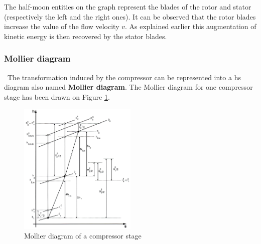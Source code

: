 The half-moon entities on the graph represent the blades of the rotor and stator (respectively the left and the right ones). It can be observed that the rotor blades increase the value of the flow velocity $v$. As explained earlier this augmentation of kinetic energy is then recovered by the stator blades. 

\subsubsection{Mollier diagram}
\quad\, The transformation induced by the compressor can be represented into a hs diagram also named \textbf{Mollier diagram}. The Mollier diagram for one compressor stage has been drawn on Figure \ref{fig:C3_Molliercomp}.

\begin{figure}[h]
\centering
\includegraphics[width=0.5\textwidth]{Comp_mollier.png}
\caption{Mollier diagram of a compressor stage \citep{Hillewaert2019}}
\label{fig:C3_Molliercomp}
\end{figure}

